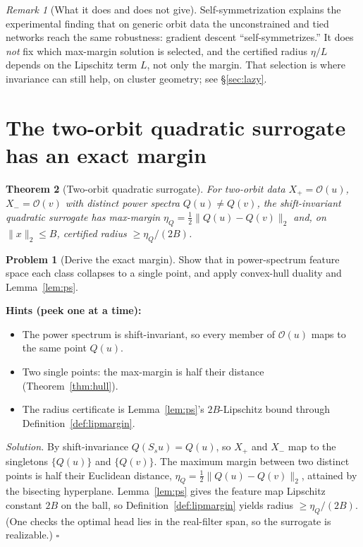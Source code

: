 \documentclass[11pt]{article}
\theoremstyle{plain}
\newtheorem{theorem}{Theorem}[section]
\theoremstyle{definition}
\newtheorem{problem}{Problem}[section]
\theoremstyle{remark}
\newtheorem{remark}[theorem]{Remark}
\newenvironment{hints}{\par\smallskip\noindent\textbf{\color{hintc}Hints (peek one at a time):}\begin{itemize}}{\end{itemize}\par\smallskip}
\newenvironment{solution}{\par\smallskip\noindent\textit{Solution.}\;}{\hfill$\square$\par\smallskip}
\newcommand{\Orb}{\mathcal O}
\begin{document}
\begin{remark}[What it does and does not give]
Self-symmetrization explains the experimental finding that on generic orbit data the unconstrained and tied networks
reach the same robustness: gradient descent ``self-symmetrizes.'' It does \emph{not} fix which max-margin solution is
selected, and the certified radius $\eta/L$ depends on the Lipschitz term $L$, not only the margin. That selection is
where invariance can still help, on cluster geometry; see \S\ref{sec:lazy}.
\end{remark}

\section{The two-orbit quadratic surrogate has an exact margin}\label{sec:quad}

\begin{theorem}[Two-orbit quadratic surrogate]\label{thm:quad}
For two-orbit data $X_+=\Orb(u)$, $X_-=\Orb(v)$ with distinct power spectra $Q(u)\ne Q(v)$, the shift-invariant
quadratic surrogate has max-margin $\eta_Q=\tfrac12\|Q(u)-Q(v)\|_2$ and, on $\|x\|_2\le B$, certified radius
$\ge\eta_Q/(2B)$.
\end{theorem}

\begin{problem}[Derive the exact margin]\label{pr:quad}
Show that in power-spectrum feature space each class collapses to a single point, and apply convex-hull duality and
Lemma~\ref{lem:ps}.
\end{problem}
\begin{hints}
\item The power spectrum is shift-invariant, so every member of $\Orb(u)$ maps to the same point $Q(u)$.
\item Two single points: the max-margin is half their distance (Theorem~\ref{thm:hull}).
\item The radius certificate is Lemma~\ref{lem:ps}'s $2B$-Lipschitz bound through Definition~\ref{def:lipmargin}.
\end{hints}
\begin{solution}
By shift-invariance $Q(S_su)=Q(u)$, so $X_+$ and $X_-$ map to the singletons $\{Q(u)\}$ and $\{Q(v)\}$. The maximum
margin between two distinct points is half their Euclidean distance, $\eta_Q=\tfrac12\|Q(u)-Q(v)\|_2$, attained by the
bisecting hyperplane. Lemma~\ref{lem:ps} gives the feature map Lipschitz constant $2B$ on the ball, so
Definition~\ref{def:lipmargin} yields radius $\ge\eta_Q/(2B)$. (One checks the optimal head lies in the real-filter
span, so the surrogate is realizable.)
\end{solution}
\end{document}
